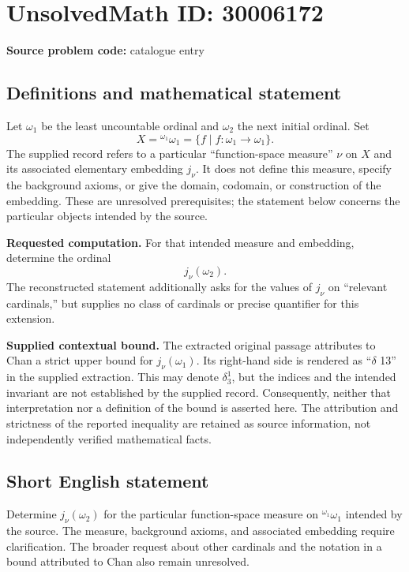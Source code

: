 \documentclass[11pt]{article}
\begin{document}
\section*{UnsolvedMath ID: 30006172}
\textbf{Source problem code:} catalogue entry
\subsection{Definitions and mathematical statement}
Let \(\omega_1\) be the least uncountable ordinal and \(\omega_2\) the next initial ordinal. Set
\[
X={}^{\omega_1}\omega_1=\{f\mid f:\omega_1\to\omega_1\}.
\]
The supplied record refers to a particular ``function-space measure'' \(\nu\) on \(X\) and its associated elementary embedding \(j_\nu\). It does not define this measure, specify the background axioms, or give the domain, codomain, or construction of the embedding. These are unresolved prerequisites; the statement below concerns the particular objects intended by the source.

\textbf{Requested computation.} For that intended measure and embedding, determine the ordinal
\[
j_\nu(\omega_2).
\]
The reconstructed statement additionally asks for the values of \(j_\nu\) on ``relevant cardinals,'' but supplies no class of cardinals or precise quantifier for this extension.

\textbf{Supplied contextual bound.} The extracted original passage attributes to Chan a strict upper bound for \(j_\nu(\omega_1)\). Its right-hand side is rendered as ``\(\delta\) 13'' in the supplied extraction. This may denote \(\delta^1_3\), but the indices and the intended invariant are not established by the supplied record. Consequently, neither that interpretation nor a definition of the bound is asserted here. The attribution and strictness of the reported inequality are retained as source information, not independently verified mathematical facts.
\subsection{Short English statement}
Determine \(j_\nu(\omega_2)\) for the particular function-space measure on \({}^{\omega_1}\omega_1\) intended by the source. The measure, background axioms, and associated embedding require clarification. The broader request about other cardinals and the notation in a bound attributed to Chan also remain unresolved.
\end{document}
